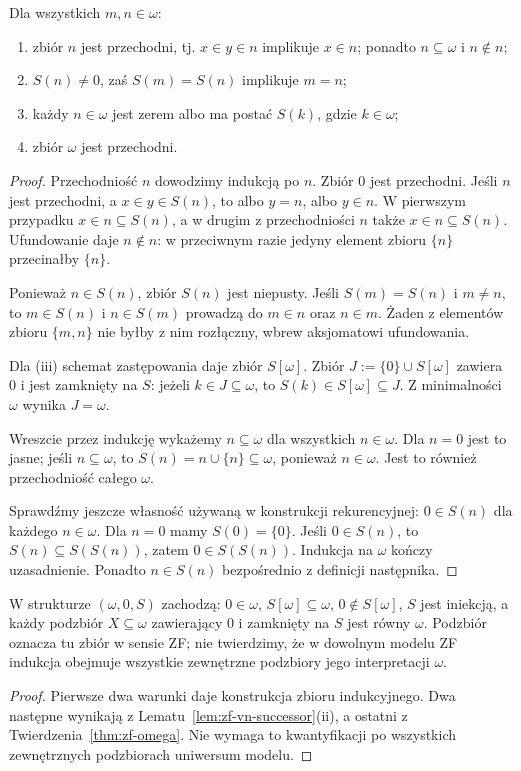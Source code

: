 \begin{lemat}\label{lem:zf-vn-successor}
Dla wszystkich $m,n\in\omega$:
\begin{enumerate}[label=(\roman*)]
\item zbiór $n$ jest przechodni, tj. $x\in y\in n$
      implikuje $x\in n$; ponadto $n\subseteq\omega$ i $n\notin n$;
\item $S(n)\ne0$, zaś $S(m)=S(n)$ implikuje $m=n$;
\item każdy $n\in\omega$ jest zerem albo ma postać $S(k)$,
      gdzie $k\in\omega$;
\item zbiór $\omega$ jest przechodni.
\end{enumerate}
\end{lemat}
\begin{proof}
Przechodniość $n$ dowodzimy indukcją po $n$.
Zbiór $0$ jest przechodni. Jeśli $n$ jest przechodni,
a $x\in y\in S(n)$, to albo $y=n$,
albo $y\in n$. W pierwszym przypadku $x\in n\subseteq S(n)$,
a w drugim z przechodniości $n$ także $x\in n\subseteq S(n)$.
Ufundowanie daje $n\notin n$: w przeciwnym razie
jedyny element zbioru $\{n\}$ przecinałby $\{n\}$.

Ponieważ $n\in S(n)$, zbiór $S(n)$ jest niepusty.
Jeśli $S(m)=S(n)$ i $m\ne n$, to
$m\in S(n)$ i $n\in S(m)$ prowadzą do
$m\in n$ oraz $n\in m$.
Żaden z elementów zbioru $\{m,n\}$ nie byłby
z nim rozłączny, wbrew aksjomatowi ufundowania.

Dla (iii) schemat zastępowania daje zbiór $S[\omega]$.
Zbiór $J:=\{0\}\cup S[\omega]$ zawiera $0$
i jest zamknięty na $S$: jeżeli $k\in J\subseteq\omega$,
to $S(k)\in S[\omega]\subseteq J$.
Z minimalności $\omega$ wynika $J=\omega$.

Wreszcie przez indukcję wykażemy $n\subseteq\omega$
dla wszystkich $n\in\omega$. Dla $n=0$ jest to jasne;
jeśli $n\subseteq\omega$, to
$S(n)=n\cup\{n\}\subseteq\omega$, ponieważ $n\in\omega$.
Jest to również przechodniość całego $\omega$.

Sprawdźmy jeszcze własność używaną w konstrukcji rekurencyjnej:
$0\in S(n)$ dla każdego $n\in\omega$.
Dla $n=0$ mamy $S(0)=\{0\}$.
Jeśli $0\in S(n)$, to
$S(n)\subseteq S(S(n))$, zatem $0\in S(S(n))$.
Indukcja na $\omega$ kończy uzasadnienie.
Ponadto $n\in S(n)$ bezpośrednio z definicji następnika.
\end{proof}

\begin{wniosek}
\label{cor:zf-peano}
W strukturze $(\omega,0,S)$ zachodzą:
$0\in\omega$, $S[\omega]\subseteq\omega$,
$0\notin S[\omega]$, $S$ jest iniekcją,
a każdy podzbiór $X\subseteq\omega$ zawierający
$0$ i zamknięty na $S$ jest równy $\omega$.
Podzbiór oznacza tu zbiór w sensie ZF;
nie twierdzimy, że w dowolnym modelu ZF
indukcja obejmuje wszystkie zewnętrzne podzbiory
jego interpretacji $\omega$.
\end{wniosek}
\begin{proof}
Pierwsze dwa warunki daje konstrukcja
zbioru indukcyjnego. Dwa następne
wynikają z Lematu~\ref{lem:zf-vn-successor}(ii),
a ostatni z Twierdzenia~\ref{thm:zf-omega}.
Nie wymaga to kwantyfikacji po wszystkich
zewnętrznych podzbiorach uniwersum modelu.
\end{proof}

